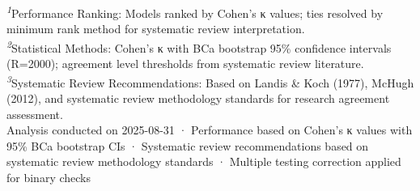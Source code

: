 \begin{table}[t]
\begin{tabular*}{\linewidth}{@{\extracolsep{\fill}}ccccccc}
\bottomrule
\end{tabular*}
\begin{minipage}{\linewidth}
\textsuperscript{\textit{1}}Performance Ranking: Models ranked by Cohen's κ values; ties resolved by minimum rank method for systematic review interpretation.\\
\textsuperscript{\textit{2}}Statistical Methods: Cohen's κ with BCa bootstrap 95\% confidence intervals (R=2000); agreement level thresholds from systematic review literature.\\
\textsuperscript{\textit{3}}Systematic Review Recommendations: Based on Landis \& Koch (1977), McHugh (2012), and systematic review methodology standards for research agreement assessment.\\
Analysis conducted on 2025-08-31 · Performance based on Cohen's κ values with 95\% BCa bootstrap CIs · Systematic review recommendations based on systematic review methodology standards · Multiple testing correction applied for binary checks\\
\end{minipage}
\end{table}


